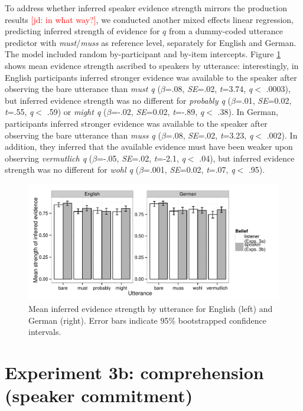 \documentclass[11pt]{article}
\newcommand{\jd}[1]{\textcolor{Red}{[jd: #1]}}
\newcommand{\figref}[1]{Figure \ref{#1}}
\begin{document}
To address whether inferred speaker evidence strength mirrors the production results \jd{in what way?}, we conducted another mixed effects linear regression, predicting inferred strength of evidence for $q$ from a dummy-coded utterance predictor with \emph{must}/\emph{muss} as reference level, separately for English and German. The model included random by-participant and by-item intercepts.  \figref{fig:exp3-evidence} shows mean evidence strength ascribed to speakers by utterance:  interestingly, in English participants inferred stronger evidence was available to the speaker after observing the bare utterance than \emph{must q} ($\beta$=.08, \emph{SE}=.02, \emph{t}=3.74, \emph{q}$<$ .0003), but inferred evidence strength was no different for \emph{probably q} ($\beta$=.01, \emph{SE}=0.02, \emph{t}=.55, \emph{q}$<$ .59) or \emph{might q} ($\beta$=-.02, \emph{SE}=0.02, \emph{t}=-.89, \emph{q}$<$ .38). In German, participants inferred stronger evidence was available to the speaker after observing the bare utterance than \emph{muss q} ($\beta$=.08, \emph{SE}=.02, \emph{t}=3.23, \emph{q}$<$ .002). In addition, they inferred that the available evidence must have been weaker upon observing \emph{vermutlich q} ($\beta$=-.05, \emph{SE}=.02, \emph{t}=-2.1, \emph{q}$<$ .04), but inferred evidence strength was no different for \emph{wohl q} ($\beta$=.001, \emph{SE}=0.02, \emph{t}=.07, \emph{q}$<$ .95).



\begin{figure}
	\centering
	\includegraphics[width=\textwidth]{pics/mean-evidence}
	\caption{Mean inferred evidence strength by utterance for English (left) and German (right). Error bars indicate 95\% bootstrapped confidence intervals.}
	\label{fig:exp3-evidence}
\end{figure}

\section{Experiment 3b: comprehension (speaker commitment)}
\end{document}
